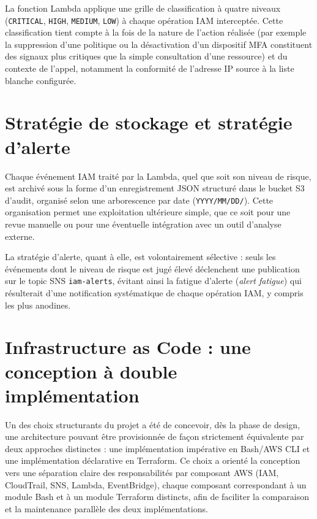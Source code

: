 \documentclass[11pt,a4paper]{report}
\begin{document}
La fonction Lambda applique une grille de classification à quatre niveaux (\texttt{CRITICAL}, \texttt{HIGH}, \texttt{MEDIUM}, \texttt{LOW}) à chaque opération IAM interceptée. Cette classification tient compte à la fois de la nature de l'action réalisée (par exemple la suppression d'une politique ou la désactivation d'un dispositif MFA constituent des signaux plus critiques que la simple consultation d'une ressource) et du contexte de l'appel, notamment la conformité de l'adresse IP source à la liste blanche configurée.

\section{Stratégie de stockage et stratégie d'alerte}

Chaque événement IAM traité par la Lambda, quel que soit son niveau de risque, est archivé sous la forme d'un enregistrement JSON structuré dans le bucket S3 d'audit, organisé selon une arborescence par date (\texttt{YYYY/MM/DD/}). Cette organisation permet une exploitation ultérieure simple, que ce soit pour une revue manuelle ou pour une éventuelle intégration avec un outil d'analyse externe.

La stratégie d'alerte, quant à elle, est volontairement sélective : seuls les événements dont le niveau de risque est jugé élevé déclenchent une publication sur le topic SNS \texttt{iam-alerts}, évitant ainsi la fatigue d'alerte (\textit{alert fatigue}) qui résulterait d'une notification systématique de chaque opération IAM, y compris les plus anodines.

\section{Infrastructure as Code : une conception à double implémentation}

Un des choix structurants du projet a été de concevoir, dès la phase de design, une architecture pouvant être provisionnée de façon strictement équivalente par deux approches distinctes : une implémentation impérative en Bash/AWS CLI et une implémentation déclarative en Terraform. Ce choix a orienté la conception vers une séparation claire des responsabilités par composant AWS (IAM, CloudTrail, SNS, Lambda, EventBridge), chaque composant correspondant à un module Bash et à un module Terraform distincts, afin de faciliter la comparaison et la maintenance parallèle des deux implémentations.

\end{document}
